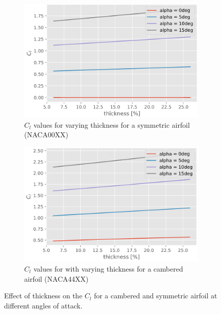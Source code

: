 \begin{figure}[h]
  \centering
  \begin{subfigure}{.5\textwidth}
    \centering
    \captionsetup{width=.8\linewidth}
    \includegraphics[width=.9\linewidth]{static/thickness_Cl_effect_00xx.png}
    \caption{\centering $C_l$ values for varying thickness for a symmetric airfoil (NACA00XX)}
    \label{fig:thickcl1}
  \end{subfigure}\hfill%
  \begin{subfigure}{.5\textwidth}
    \centering
    \captionsetup{width=.9\linewidth}
    \includegraphics[width=.9\linewidth]{static/thickness_Cl_effect_44xx.png}
    \caption{\centering $C_l$ values for with varying thickness for a cambered airfoil (NACA44XX)}
    \label{fig:thickcl2}
  \end{subfigure}
  \caption{\centering Effect of thickness on the $C_l$ for a cambered and symmetric airfoil at different angles of attack.}
  \label{fig:thickcl}
\end{figure}



